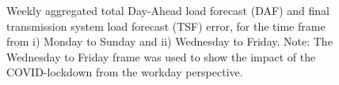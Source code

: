 \documentclass[energies,article,submit,moreauthors,pdftex]{Definitions/mdpi}
\begin{document}
\begin{figure}[!tbp]
  \centering
  \hfill
  \caption{Weekly aggregated total Day-Ahead load forecast (DAF) and final transmission system load forecast (TSF) error, for the time frame from i) Monday to Sunday and ii) Wednesday to Friday. Note: The Wednesday to Friday frame was used to show the impact of the COVID-lockdown from the workday perspective.}
  \label{fig:DAFandTSFerror}
\end{figure}

\end{document}
